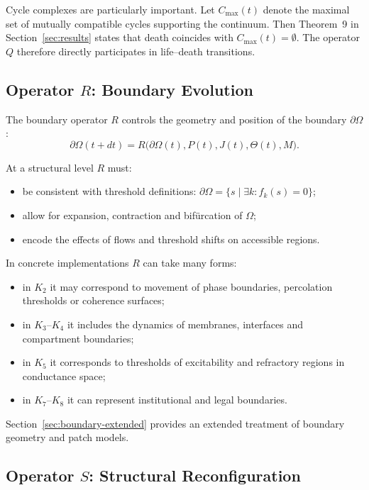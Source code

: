 Cycle complexes are particularly important. Let \(C_{\max}(t)\) denote the
maximal set of mutually compatible cycles supporting the continuum. Then
Theorem~9 in Section~\ref{sec:results} states that death coincides with
\(C_{\max}(t) = \emptyset\). The operator \(Q\) therefore directly participates
in life–death transitions.

\subsection{Operator \texorpdfstring{\texorpdfstring{$R$}{R}}{R}: Boundary Evolution}

The boundary operator \(R\) controls the geometry and position of the boundary
\(\partial\Omega\):
\[
  \partial\Omega(t+dt) =
    R\big(\partial\Omega(t), P(t), J(t), \Theta(t), M\big).
\]

At a structural level \(R\) must:
\begin{itemize}
  \item be consistent with threshold definitions:
        \(\partial\Omega = \{ s \mid \exists k: f_k(s) = 0 \}\);
  \item allow for expansion, contraction and bifürcation of \(\Omega\);
  \item encode the effects of flows and threshold shifts on accessible regions.
\end{itemize}

In concrete implementations \(R\) can take many forms:
\begin{itemize}
  \item in \(K_2\) it may correspond to movement of phase boundaries,
        percolation thresholds or coherence surfaces;
  \item in \(K_3\)–\(K_4\) it includes the dynamics of membranes, interfaces
        and compartment boundaries;
  \item in \(K_5\) it corresponds to thresholds of excitability and refractory
        regions in conductance space;
  \item in \(K_7\)–\(K_8\) it can represent institutional and legal
        boundaries.
\end{itemize}

Section~\ref{sec:boundary-extended} provides an extended treatment of boundary
geometry and patch models.

\subsection{Operator \texorpdfstring{\texorpdfstring{$S$}{S}}{S}: Structural Reconfiguration}

